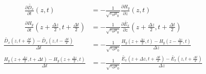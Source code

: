 \documentclass[12pt]{article}
\begin{document}
\begin{subequations}
\begin{align}
\label{eq:offset_dD_dt}\frac{\partial \tilde{D_x}}{\partial t}(z, t) &= -\frac{1}{\sqrt{\varepsilon_0\mu_0}}\frac{\partial H_y}{\partial z}(z, t)\\
\label{eq:offset_dH_dt}\frac{\partial H_y}{\partial t}\left(z+\frac{\Delta z}{2},t+\frac{\Delta t}{2}\right) &= -\frac{1}{\sqrt{\varepsilon_0\mu_0}}\frac{\partial \tilde{E_x}}{\partial z}\left(z+\frac{\Delta z}{2},t+\frac{\Delta t}{2}\right)
\end{align}
\end{subequations}
\begin{subequations}
\begin{align}
\label{eq:first_discrete_dD_dt}\frac{\tilde{D_x}\left(z,t+\frac{\Delta t}{2}\right)-\tilde{D_x}\left(z,t-\frac{\Delta t}{2}\right)}{\Delta t} &= -\frac{1}{\sqrt{\varepsilon_0\mu_0}}\frac{H_y\left(z+\frac{\Delta z}{2},t\right)-H_y\left(z-\frac{\Delta z}{2},t\right)}{\Delta z} \\
\label{eq:first_discrete_dH_dt}\frac{H_y\left(z+\frac{\Delta z}{2},t+\Delta t\right)-H_y\left(z+\frac{\Delta z}{2},t\right)}{\Delta t} &= -\frac{1}{\sqrt{\varepsilon_0\mu_0}}\frac{\tilde{E_x}\left(z+\Delta z,t+\frac{\Delta t}{2}\right)-\tilde{E_x}\left(z,t+\frac{\Delta t}{2}\right)}{\Delta z}
\end{align}
\end{subequations}
\end{document}

